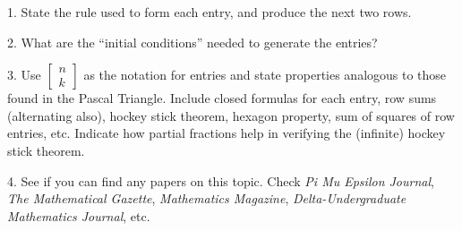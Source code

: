 \documentclass[10pt,]{book}
\theoremstyle{plain}
\theoremstyle{definition}
\theoremstyle{definition}
\theoremstyle{definition}
\numberwithin{equation}{chapter}
\begin{document}
\begin{exerciselist}
\item[1.]\hypertarget{exercise-46}{}\hypertarget{p-1721}{}%
State the rule used to form each entry, and produce the next two rows.%
\par\smallskip
\item[2.]\hypertarget{exercise-47}{}\hypertarget{p-1722}{}%
What are the ``initial conditions'' needed to generate the entries?%
\par\smallskip
\item[3.]\hypertarget{exercise-48}{}\hypertarget{p-1723}{}%
Use \(\begin{bmatrix} n\\ k \end{bmatrix}\) as the notation for entries and state properties analogous to those found in the Pascal Triangle. Include closed formulas for each entry, row sums (alternating also), hockey stick theorem, hexagon property, sum of squares of row entries, etc. Indicate how partial fractions help in verifying the (infinite) hockey stick theorem.%
\par\smallskip
\item[4.]\hypertarget{exercise-49}{}\hypertarget{p-1724}{}%
See if you can find any papers on this topic. Check \emph{Pi Mu Epsilon Journal}, \emph{The Mathematical Gazette}, \emph{Mathematics Magazine}, \emph{Delta-Undergraduate Mathematics Journal}, etc.%
\par\smallskip
\end{exerciselist}
\typeout{************************************************}
\typeout{************************************************}
\end{document}
